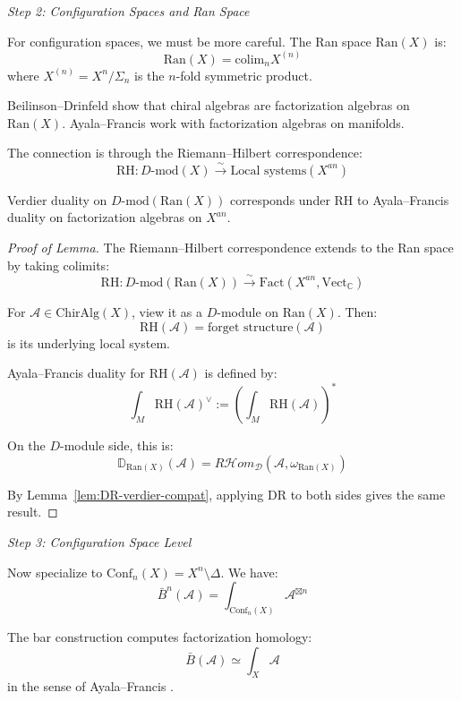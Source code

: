 \emph{Step 2: Configuration Spaces and Ran Space}

For configuration spaces, we must be more careful. The Ran space $\text{Ran}(X)$ is:
\[\text{Ran}(X) = \text{colim}_{n} X^{(n)}\]
where $X^{(n)} = X^n / \Sigma_n$ is the $n$-fold symmetric product.

Beilinson--Drinfeld \cite{BD04} show that chiral algebras are factorization algebras on 
$\text{Ran}(X)$. Ayala--Francis \cite{AF15} work with factorization algebras on manifolds.

The connection is through the Riemann--Hilbert correspondence:
\[\text{RH}: D\text{-mod}(X) \xrightarrow{\sim} \text{Local systems}(X^{an})\]

\begin{lemma}\label{lem:ran-duality-AF}
Verdier duality on $D\text{-mod}(\text{Ran}(X))$ corresponds under $\text{RH}$ to 
Ayala--Francis duality on factorization algebras on $X^{an}$.
\end{lemma}

\begin{proof}[Proof of Lemma]
The Riemann--Hilbert correspondence extends to the Ran space by taking colimits:
\[\text{RH}: D\text{-mod}(\text{Ran}(X)) \xrightarrow{\sim} 
\text{Fact}(X^{an}, \text{Vect}_\mathbb{C})\]

For $\mathcal{A} \in \text{ChirAlg}(X)$, view it as a $D$-module on $\text{Ran}(X)$. Then:
\[\text{RH}(\mathcal{A}) = \text{forget structure}(\mathcal{A})\]
is its underlying local system.

Ayala--Francis duality for $\text{RH}(\mathcal{A})$ is defined by:
\[\int_M \text{RH}(\mathcal{A})^{\vee} := \left(\int_M \text{RH}(\mathcal{A})\right)^*\]

On the $D$-module side, this is:
\[\mathbb{D}_{\text{Ran}(X)}(\mathcal{A}) = R\mathcal{H}om_{\mathcal{D}}(\mathcal{A}, 
\omega_{\text{Ran}(X)})\]

By Lemma~\ref{lem:DR-verdier-compat}, applying $\text{DR}$ to both sides gives the same result.
\end{proof}

\emph{Step 3: Configuration Space Level}

Now specialize to $\text{Conf}_n(X) = X^n \setminus \Delta$. We have:
\[\bar{B}^n(\mathcal{A}) = \int_{\text{Conf}_n(X)} \mathcal{A}^{\boxtimes n}\]

\begin{lemma}\label{lem:bar-as-fact-hom-AF}
The bar construction computes factorization homology:
\[\bar{B}(\mathcal{A}) \simeq \int_{X} \mathcal{A}\]
in the sense of Ayala--Francis \cite{AF15}.
\end{lemma}

